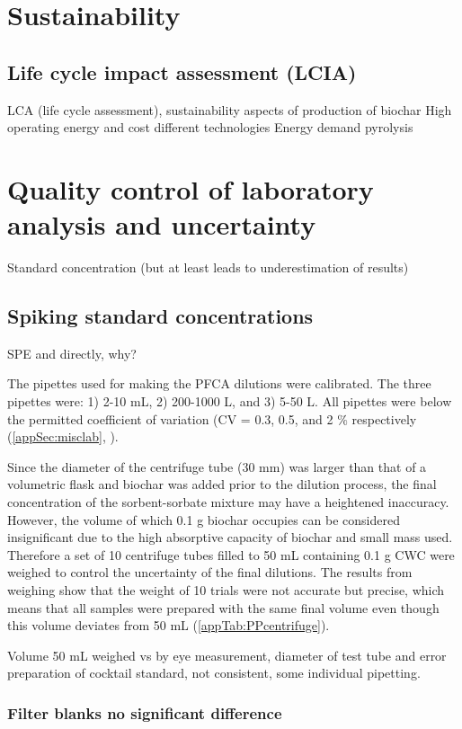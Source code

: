 \section{Sustainability}
\subsection{Life cycle impact assessment (LCIA)}
LCA (life cycle assessment), sustainability aspects of production of biochar
High operating energy and cost different technologies \citep{Alhashimi2017}
Energy demand pyrolysis 

\section{Quality control of laboratory analysis and uncertainty}
Standard concentration (but at least leads to underestimation of results)
\subsection{Spiking standard concentrations}
SPE and directly, why?

The pipettes used for making the PFCA dilutions were calibrated. The three pipettes were: 1) 2-10 mL, 2) 200-1000 \textmu L, and 3) 5-50 \textmu L. All pipettes were below the permitted coefficient of variation (CV = 0.3, 0.5, and 2 $\%$ respectively (\cref{appSec:misclab}, ).

Since the diameter of the centrifuge tube (30 mm) was larger than that of a volumetric flask and biochar was added prior to the dilution process, the final concentration of the sorbent-sorbate mixture may have a heightened inaccuracy. However, the volume of which 0.1 g biochar occupies can be considered insignificant due to the high absorptive capacity of biochar and small mass used. Therefore a set of 10 centrifuge tubes filled to 50 mL containing 0.1 g CWC were weighed to control the uncertainty of the final dilutions. The results from weighing show that the weight of 10 trials were not accurate but precise, which means that all samples were prepared with the same final volume even though this volume deviates from 50 mL (\cref{appTab:PPcentrifuge}). 

Volume 50 mL weighed vs by eye measurement, diameter of test tube and error
preparation of cocktail standard, not consistent, some individual pipetting. 

\subsubsection{Filter blanks no significant difference}\label{subsec:FB}

